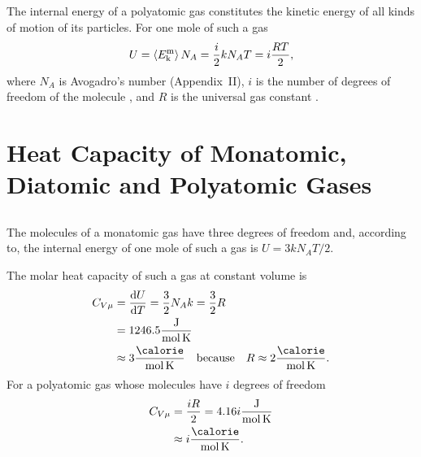 \subsection{}\label{10.6.6} The internal energy  of a polyatomic gas consti­tutes the kinetic energy of all kinds of motion of its particles. For one mole of such a gas
\begin{equation*}%
U = \expval{E_{\text{k}}^{\text{m}}} N_{A}= \frac{i}{2} k N_{A}T = i \frac{RT}{2},
\end{equation*}
where $N_{A}$ is Avogadro's number (Appendix~II), $i$ is the number of degrees of freedom of the molecule , and $R$ is the universal gas constant .


\section[Heat Capacity of Gases]{Heat Capacity of Monatomic, Diatomic and Polyatomic Gases}

\subsection{}\label{10.7.1} The molecules of a monatomic gas have three degrees of freedom  and, according to, the inter­nal energy of one mole of such a gas is $U = 3kN_{A}T/2$.

The molar heat capacity of such a gas at constant volume  is
\begin{align*}%
C_{V\mu} & = \dv{U}{T} =\frac{3}{2} N_{A} k = \frac{3}{2} R \\
& = 1246.5 \frac{\si{\joule}}{\si{\mole\kelvin}} \\
& \approx 3  \frac{\si{\calorie}}{\si{\mole\kelvin}}\qq{because} R \approx 2  \frac{\si{\calorie}}{\si{\mole\kelvin}}.
\end{align*}
For a polyatomic gas whose molecules have $i$ degrees of freedom
\begin{align*}%
C_{V\mu} & = \frac{iR}{2} = 4.16 i \frac{\si{\joule}}{\si{\mole\kelvin}} \\
& \approx i  \frac{\si{\calorie}}{\si{\mole\kelvin}}.
\end{align*}

